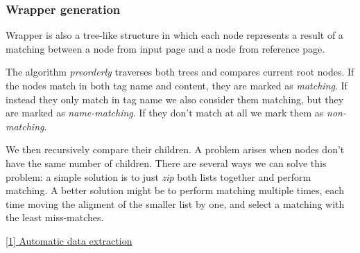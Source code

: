 \documentclass[runningheads]{llncs}
\begin{document}
\subsubsection{Wrapper generation}

Wrapper is also a tree-like structure in which each node represents a result of a matching between a node from input page and a node from reference page. 

The algorithm \textit{preorderly} traverses both trees and compares current root nodes. If the nodes match in both tag name and content, they are marked as \textit{matching}. If instead they only match in tag name we also consider them matching, but they are marked as \textit{name-matching}. If they don't match at all we mark them as \textit{non-matching}.

We then recursively compare their children. A problem arises when nodes don't have the same number of children. There are several ways we can solve this problem: a simple solution is to just \textit{zip} both lists together and perform matching. A better solution might be to perform matching multiple times, each time moving the aligment of the smaller list by one, and select a matching with the least miss-matches.

\href{https://www.researchgate.net/publication/221213613_RoadRunner_Automatic_data_extraction_from_data-intensive_Web_sites}{[1] Automatic data extraction}
\end{document}
